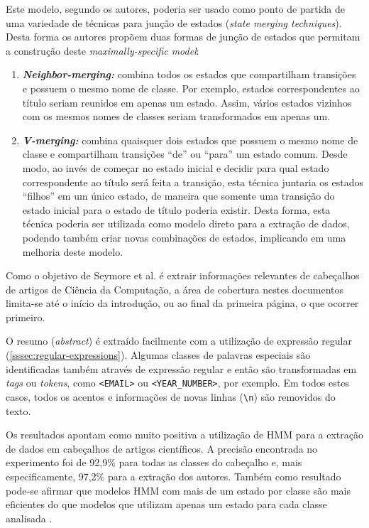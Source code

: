 Este modelo, segundo os autores, poderia ser usado como ponto de partida de uma variedade de técnicas para junção de estados (\textit{state merging techniques}). Desta forma os autores propõem duas formas de junção de estados que permitam a construção deste \textit{maximally-specific model}:

\begin{enumerate}

\item \textit{\textbf{Neighbor-merging:}} combina todos os estados que compartilham transições e possuem o mesmo nome de classe. Por exemplo, estados correspondentes ao título seriam reunidos em apenas um estado. Assim, vários estados vizinhos com os mesmos nomes de classes seriam transformados em apenas um.

\item \textit{\textbf{V-merging:}} combina quaisquer dois estados que possuem o mesmo nome de classe e compartilham transições ``de'' ou ``para'' um estado comum. Desde modo, ao invés de começar no estado inicial e decidir para qual estado correspondente ao título será feita a transição, esta técnica juntaria os estados ``filhos'' em um único estado, de maneira que somente uma transição do estado inicial para o estado de título poderia existir. Desta forma, esta técnica poderia ser utilizada como modelo direto para a extração de dados, podendo também criar novas combinações de estados, implicando em uma melhoria deste modelo.

\end{enumerate}

Como o objetivo de Seymore et al. é extrair informações relevantes de cabeçalhos de artigos de Ciência da Computação, a área de cobertura nestes documentos limita-se até o início da introdução, ou ao final da primeira página, o que ocorrer primeiro.

O resumo (\textit{abstract}) é extraído facilmente com a utilização de expressão regular (\autoref{sssec:regular-expressions}). Algumas classes de palavras especiais são identificadas também através de expressão regular e então são transformadas em \textit{tags} ou \textit{tokens}, como \texttt{<EMAIL>} ou \texttt{<YEAR\_NUMBER>}, por exemplo. Em todos estes casos, todos os acentos e informações de novas linhas (\texttt{\textbackslash{n}}) são removidos do texto.

Os resultados apontam como muito positiva a utilização de HMM para a extração de dados em cabeçalhos de artigos científicos. A precisão encontrada no experimento foi de 92,9\% para todas as classes do cabeçalho e, mais especificamente, 97,2\% para a extração dos autores. Também como resultado pode-se afirmar que modelos HMM com mais de um estado por classe são mais eficientes do que modelos que utilizam apenas um estado para cada classe analisada \cite{Seymore-HMM-IE}.

